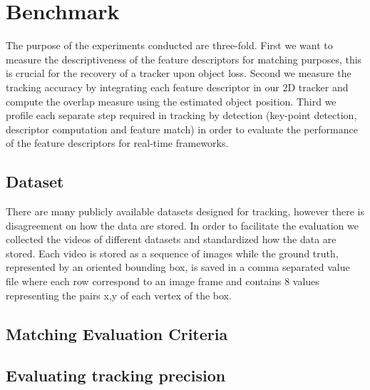 \section{Benchmark}

The purpose of the experiments conducted are three-fold. First we want to measure the descriptiveness of the feature descriptors for matching purposes, this is crucial for the recovery of a tracker upon object loss. Second we measure the tracking accuracy by integrating each feature descriptor in our 2D tracker and compute the overlap measure using the estimated object position. Third we profile each separate step required in tracking by detection (key-point detection, descriptor computation and feature match) in order to evaluate the performance of the feature descriptors for real-time frameworks.

\subsection{Dataset}


There are many publicly available datasets designed for tracking, however there is disagreement on how the data are stored. In order to facilitate the evaluation we collected the videos of different datasets and standardized how the data are stored. Each video is stored as a sequence of images while the ground truth, represented by an oriented bounding box, is saved in a comma separated value file where each row correspond to an image frame and contains 8 values representing the pairs x,y of each vertex of the box.  

\subsection{Matching Evaluation Criteria}


\subsection{Evaluating tracking precision}


